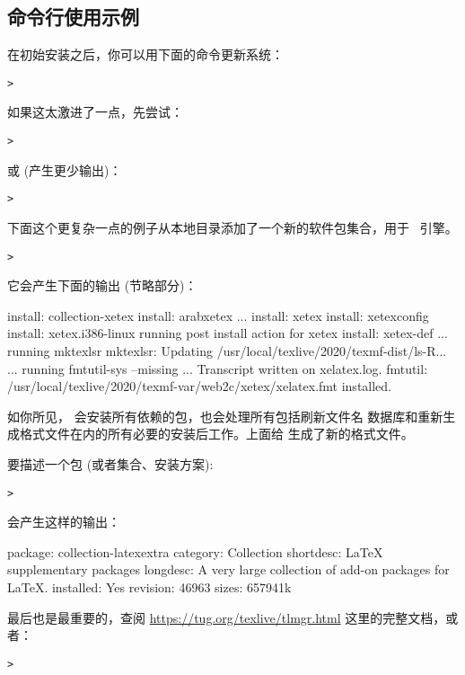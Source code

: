 \documentclass{article}
\begin{document}
\subsection{ 命令行使用示例}

在初始安装之后，你可以用下面的命令更新系统：
\begin{alltt}
> 
\end{alltt}
如果这太激进了一点，先尝试：
\begin{alltt}
> 
\end{alltt}
或 (产生更少输出)：
\begin{alltt}
> 
\end{alltt}

下面这个更复杂一点的例子从本地目录添加了一个新的软件包集合，用于 \XeTeX\ 引擎。

\begin{alltt}
> 
\end{alltt}
它会产生下面的输出 (节略部分)：
\begin{fverbatim}
install: collection-xetex
install: arabxetex
...
install: xetex
install: xetexconfig
install: xetex.i386-linux
running post install action for xetex
install: xetex-def
...
running mktexlsr
mktexlsr: Updating /usr/local/texlive/2020/texmf-dist/ls-R...
...
running fmtutil-sys --missing
...
Transcript written on xelatex.log.
fmtutil: /usr/local/texlive/2020/texmf-var/web2c/xetex/xelatex.fmt installed.
\end{fverbatim}

如你所见， 会安装所有依赖的包，也会处理所有包括刷新文件名
数据库和重新生成格式文件在内的所有必要的安装后工作。上面给 \XeTeX{}
生成了新的格式文件。

要描述一个包 (或者集合、安装方案):
\begin{alltt}
> 
\end{alltt}
会产生这样的输出：
\begin{fverbatim}
package:    collection-latexextra
category:   Collection
shortdesc:  LaTeX supplementary packages
longdesc:   A very large collection of add-on packages for LaTeX.
installed:  Yes
revision:   46963
sizes:      657941k
\end{fverbatim}

最后也是最重要的，查阅 \url{https://tug.org/texlive/tlmgr.html}
这里的完整文档，或者：
\begin{alltt}
> 
\end{alltt}
\end{document}
